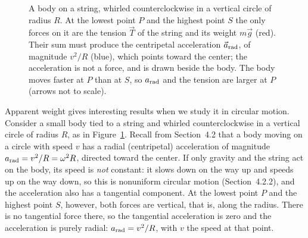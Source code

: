 \documentclass[11pt,a4paper]{article}
\begin{document}
\begin{figure}[ht]
\centering
\begin{minipage}[c]{0.46\textwidth}
\centering
{}
\end{minipage}\hfill
\begin{minipage}[c]{0.5\textwidth}
\caption{A body on a string, whirled counterclockwise in a vertical circle of radius $R$. At the
lowest point $P$ and the highest point $S$ the only forces on it are the tension $\vec{T}$ of the
string and its weight $m\vec{g}$ (red). Their sum must produce the centripetal acceleration
$\vec{a}_{\mathrm{rad}}$, of magnitude $v^2/R$ (blue), which points toward the center; the
acceleration is not a force, and is drawn beside the body. The body moves faster at $P$ than at $S$,
so $a_{\mathrm{rad}}$ and the tension are larger at $P$ (arrows not to scale).}\label{fig:vcircle}
\end{minipage}
\end{figure}

Apparent weight gives interesting results when we study it in circular motion. Consider a small body
tied to a string and whirled counterclockwise in a vertical circle of radius $R$, as in
Figure~\ref{fig:vcircle}. Recall from Section~4.2 that a body moving on a circle with speed $v$ has a
radial (centripetal) acceleration of magnitude $a_{\mathrm{rad}} = v^2/R = \omega^2 R$, directed toward the
center. If only gravity and the string act on the body, its speed is \emph{not} constant: it slows
down on the way up and speeds up on the way down, so this is nonuniform circular motion
(Section~4.2.2), and the acceleration also has a tangential component. At the lowest point $P$ and
the highest point $S$, however, both forces are vertical, that is, along the radius. There is no
tangential force there, so the tangential acceleration is zero and the acceleration is purely
radial: $a_{\mathrm{rad}} = v^2/R$, with $v$ the speed at that point.
\end{document}
